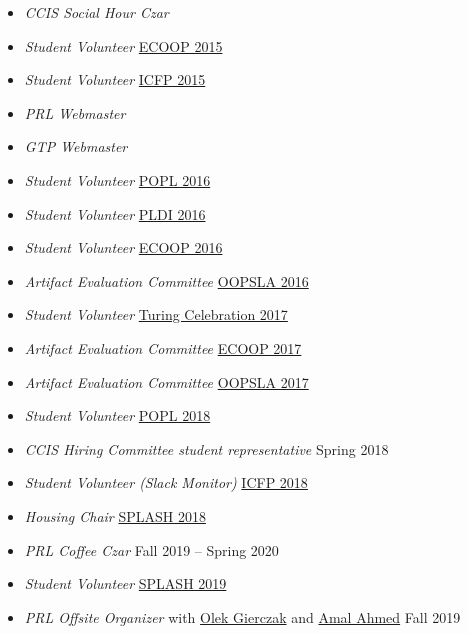 \documentclass{article}
\begin{document}
\begin{itemize}
  \item \emph{CCIS Social Hour Czar} \hfill {}
  \item \emph{Student Volunteer} \hfill \href{http://2015.ecoop.org/}{ECOOP 2015}
  \item \emph{Student Volunteer} \hfill \href{http://icfpconference.org/icfp2015/}{ICFP 2015}
  \item \emph{PRL Webmaster} \hfill \href{https://github.com/nuprl/website}{}
  \item \emph{GTP Webmaster} \hfill \href{https://github.com/nuprl/gtp.github.io}{}
  \item \emph{Student Volunteer} \hfill \href{http://conf.researchr.org/home/POPL-2016}{POPL 2016}
  \item \emph{Student Volunteer} \hfill \href{http://conf.researchr.org/home/PLDI-2016}{PLDI 2016}
  \item \emph{Student Volunteer} \hfill \href{http://2016.ecoop.org/}{ECOOP 2016}
  \item \emph{Artifact Evaluation Committee} \hfill \href{http://2016.splashcon.org/track/splash-2016-artifacts}{OOPSLA 2016}
  \item \emph{Student Volunteer} \hfill \href{https://www.acm.org/turing-award-50/conference}{Turing Celebration 2017}
  \item \emph{Artifact Evaluation Committee} \hfill \href{https://2017.ecoop.org/track/ecoop-2017-Artifacts}{ECOOP 2017}
  \item \emph{Artifact Evaluation Committee} \hfill \href{https://2017.splashcon.org/track/splash-2017-OOPSLA-Artifacts}{OOPSLA 2017}
  \item \emph{Student Volunteer} \hfill \href{http://conf.researchr.org/home/POPL-2018}{POPL 2018}
  \item \emph{CCIS Hiring Committee student representative} \hfill {Spring 2018}
  \item \emph{Student Volunteer (Slack Monitor)} \hfill \href{https://icfp18.sigplan.org/committee/icfp-2018-organizing-committee}{ICFP 2018}
  \item \emph{Housing Chair} \hfill \href{https://2018.splashcon.org/committee/splash-2018-organizing-committee}{SPLASH 2018}
  \item \emph{PRL Coffee Czar} \hfill {Fall 2019 -- Spring 2020}
  \item \emph{Student Volunteer} \hfill \href{https://2019.splashcon.org/}{SPLASH 2019}
  \item \emph{PRL Offsite Organizer} with \href{https://www.khoury.northeastern.edu/people/olek-gierczak/}{Olek Gierczak} and \href{http://ccs.neu.edu/home/amal/}{Amal Ahmed} \hfill {Fall 2019}
\end{itemize}
\end{document}
